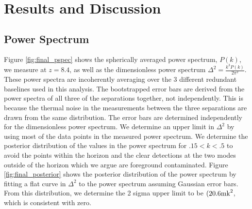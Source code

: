 \documentclass[twocolumn,numberedappendix]{emulateapj} \shorttitle{PSA64}
\begin{document}
%




\section{Results and Discussion}\label{sec:results}
\subsection{Power Spectrum}
Figure \ref{fig:final_pspec} shows the spherically averaged power spectrum,
$P(k)$, we measure at $z=8.4$, as well as the dimensionless power spectrum
$\Delta^{2} = \frac{k^{3}P(k)}{2\pi^{2}}$. These power spectra are incoherently
averaging over the 3 different redundant baselines used in this analysis. The
bootstrapped error bars are derived from the power spectra of all three of the
separations together, not independently. This is because the thermal noise in
the measurements between the three separations are drawn from the same
distribution. The error bars are determined independently for the dimensionless
power spectrum. We determine an upper limit in $\Delta^{2}$ by using most of the
data points in the measured power spectrum. We determine the posterior
distribution of the values in the power spectrum for $.15<k<.5$ to avoid the
points within the horizon and the clear detections at the two modes outside of
the horizon which we argue are foreground contaminated. Figure
\ref{fig:final_posterior} shows the posterior distribution of the power spectrum
by fitting a flat curve in $\Delta^{2}$ to the power spectrum assuming
Gaussian error bars. From this distribution, we determine the 2 sigma upper
limit to be $(20.6 \rm{mk}^{2}$, which is consistent with zero.
\end{document}

